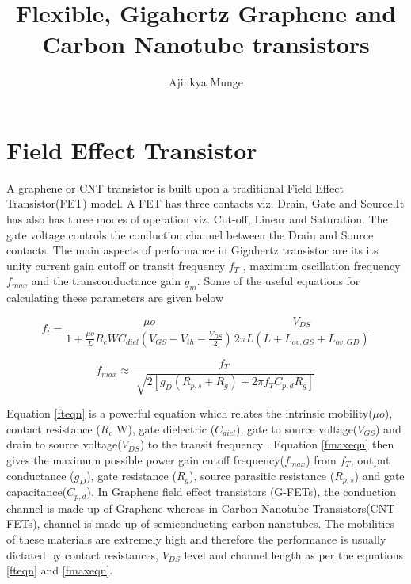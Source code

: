 \documentclass[a4paper,11pt]{article}
\date{}
\title{Flexible, Gigahertz Graphene and Carbon Nanotube transistors}
\author{Ajinkya Munge}
\begin{document}
\maketitle

\section{Field Effect Transistor}
A graphene or CNT transistor is built upon a traditional Field Effect Transistor(FET) model. A FET has three contacts viz. Drain, Gate and Source.It has also has three modes of operation viz. Cut-off, Linear and Saturation. The gate voltage controls the conduction channel between the Drain and Source contacts. The main aspects of performance in Gigahertz transistor are its its unity current gain cutoff or transit frequency $f_T$ , maximum oscillation frequency $f_{max}$ and the transconductance gain $g_m$. Some of the useful equations for calculating these parameters are given below    

\begin{equation} \label{fteqn}
f_t = \frac{\mu o}{1+ \frac{\mu o}{L} R_c W C_{diel} (V_{GS} - V_{th} - \frac{V_{DS}}{2} )  } \frac{V_{DS}}{2 \pi L (L + L_{ov,GS} +L_{ov,GD})}
\end{equation}

\begin{equation} \label{fmaxeqn}
  f_{max} \approx \frac{f_T}{\sqrt[]{2[g_D (R_{p,s} + R_{g}) + 2 \pi f_T C_{p,d} R_{g}]}} 
\end{equation}

Equation \ref{fteqn} is a powerful equation which relates the intrinsic mobility($\mu o$),  contact resistance ($R_c$ W), gate dielectric ($C_{diel}$), gate to source voltage($V_{GS}$) and drain to source voltage($V_{DS}$) to the transit frequency \cite{klauk2018will}. Equation \ref{fmaxeqn} then gives the maximum possible power gain cutoff frequency($f_{max}$) from $f_T$, output conductance ($g_D$), gate resistance ($R_g$), source parasitic resistance ($R_{p,s}$) and gate capacitance($C_{p,d}$).    
\newline
In Graphene field effect transistors (G-FETs), the conduction channel is made up of Graphene \cite{yeh2014gigahertz} whereas in Carbon Nanotube Transistors(CNT-FETs), channel is made up of semiconducting carbon nanotubes\cite{zhong2017carbon}. The mobilities of these materials are extremely high and therefore the performance is usually dictated by contact resistances, $V_{DS}$ level and channel length as per the equations \ref{fteqn} and \ref{fmaxeqn}.
\end{document}
